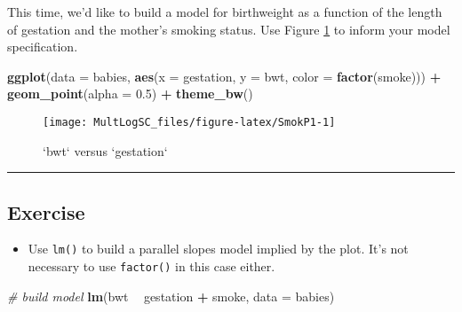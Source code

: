 \documentclass[]{book}
\newenvironment{Shaded}{\begin{snugshade}}{\end{snugshade}}
\newcommand{\KeywordTok}[1]{\textcolor[rgb]{0.13,0.29,0.53}{\textbf{#1}}}
\newcommand{\DataTypeTok}[1]{\textcolor[rgb]{0.13,0.29,0.53}{#1}}
\newcommand{\FloatTok}[1]{\textcolor[rgb]{0.00,0.00,0.81}{#1}}
\newcommand{\StringTok}[1]{\textcolor[rgb]{0.31,0.60,0.02}{#1}}
\newcommand{\CommentTok}[1]{\textcolor[rgb]{0.56,0.35,0.01}{\textit{#1}}}
\newcommand{\OperatorTok}[1]{\textcolor[rgb]{0.81,0.36,0.00}{\textbf{#1}}}
\newcommand{\NormalTok}[1]{#1}
\providecommand{\tightlist}{%
  \setlength{\itemsep}{0pt}\setlength{\parskip}{0pt}}
\begin{document}
This time, we'd like to build a model for birthweight as a function of
the length of gestation and the mother's smoking status. Use Figure
\ref{fig:SmokP1} to inform your model specification.

\begin{Shaded}
\begin{Highlighting}[]
\KeywordTok{ggplot}\NormalTok{(}\DataTypeTok{data =}\NormalTok{ babies, }\KeywordTok{aes}\NormalTok{(}\DataTypeTok{x =}\NormalTok{ gestation, }\DataTypeTok{y =}\NormalTok{ bwt, }\DataTypeTok{color =} \KeywordTok{factor}\NormalTok{(smoke))) }\OperatorTok{+}
\StringTok{  }\KeywordTok{geom_point}\NormalTok{(}\DataTypeTok{alpha =} \FloatTok{0.5}\NormalTok{) }\OperatorTok{+}
\StringTok{  }\KeywordTok{theme_bw}\NormalTok{()}
\end{Highlighting}
\end{Shaded}

\begin{figure}

{\centering \texttt{[image: MultLogSC\_files/figure-latex/SmokP1-1]} 

}

\caption{`bwt` versus `gestation`}\label{fig:SmokP1}
\end{figure}

\begin{center}\rule{0.5\linewidth}{\linethickness}\end{center}

\subsection*{Exercise}\label{exercise-3}

\begin{itemize}
\tightlist
\item
  Use \texttt{lm()} to build a parallel slopes model implied by the
  plot. It's not necessary to use \texttt{factor()} in this case either.
\end{itemize}

\begin{Shaded}
\begin{Highlighting}[]
\CommentTok{# build model}
\KeywordTok{lm}\NormalTok{(bwt }\OperatorTok{~}\StringTok{ }\NormalTok{gestation }\OperatorTok{+}\StringTok{ }\NormalTok{smoke, }\DataTypeTok{data =}\NormalTok{ babies)}
\end{Highlighting}
\end{Shaded}
\end{document}
